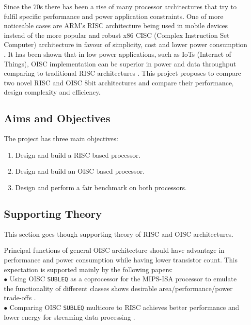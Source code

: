Since the 70s there has been a rise of many processor architectures that try to fulfil specific performance and power application constraints. One of more noticeable cases are ARM's RISC  architecture being used in mobile devices instead of the more popular and robust x86 CISC (Complex Instruction Set Computer) architecture in favour of simplicity, cost and lower power consumption \autocite{jamil_1995,blem_menon_sankaralingam_2013}. It has been shown that in low power applications, such as IoTs (Internet of Things), OISC implementation can be superior in power and data throughput comparing to traditional RISC architectures \autocite{yokota_saso_hara-azumi_2017, ahmed_sakamoto_anderson_hara-azumi_2015}. This project proposes to compare two novel RISC and OISC 8bit architectures and compare their performance, design complexity and efficiency.


\subsection{Aims and Objectives}

The project has three main objectives:
\begin{enumerate}
	\item Design and build a RISC based processor.
	\item Design and build an OISC based processor. 
	\item Design and perform a fair benchmark on both processors. 
\end{enumerate}

\subsection{Supporting Theory}
\label{subsec:supporting_theory}
This section goes though supporting theory of RISC and OISC architectures.

Principal functions of general OISC architecture should have advantage in performance and power consumption while having lower transistor count. This expectation is supported mainly by the following papers:\\
$\bullet$ Using OISC \texttt{SUBLEQ} as a coprocessor for the MIPS-ISA processor to emulate the functionality of different classes shows desirable area/performance/power trade-offs \autocite{ahmed_sakamoto_anderson_hara-azumi_2015}.\\
$\bullet$ Comparing OISC \texttt{SUBLEQ} multicore to RISC achieves better performance and lower energy for streaming data processing \autocite{yokota_saso_hara-azumi_2017}.


